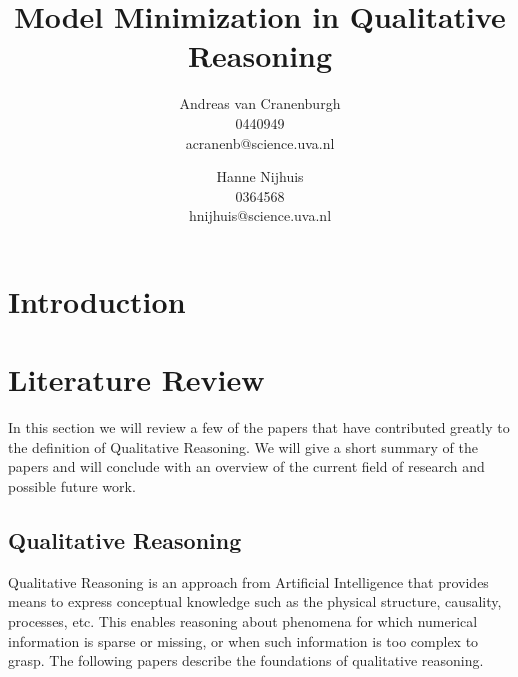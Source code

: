 \documentclass{article} %
\title{Model Minimization in Qualitative Reasoning}
\author{Andreas van Cranenburgh \\ 0440949 \\ acranenb@science.uva.nl 
\and Hanne Nijhuis \\ 0364568 \\ hnijhuis@science.uva.nl}
\begin{document}
\maketitle


\vspace{15em}


\newpage

\tableofcontents

\newpage

\section{Introduction}

\section{Literature Review}

In this section we will review a few of the papers that have contributed
greatly to the definition of Qualitative Reasoning. We will give a short
summary of the papers and will conclude with an overview of the current field
of research and possible future work. 

\subsection{Qualitative Reasoning}
Qualitative Reasoning is an approach from Artificial Intelligence that provides
means to express conceptual knowledge such as the physical structure,
causality, processes, etc.  This enables reasoning about phenomena for which
numerical information is sparse or missing, or when such information is too
complex to grasp.  The following papers describe the foundations of qualitative
reasoning.
\end{document}
